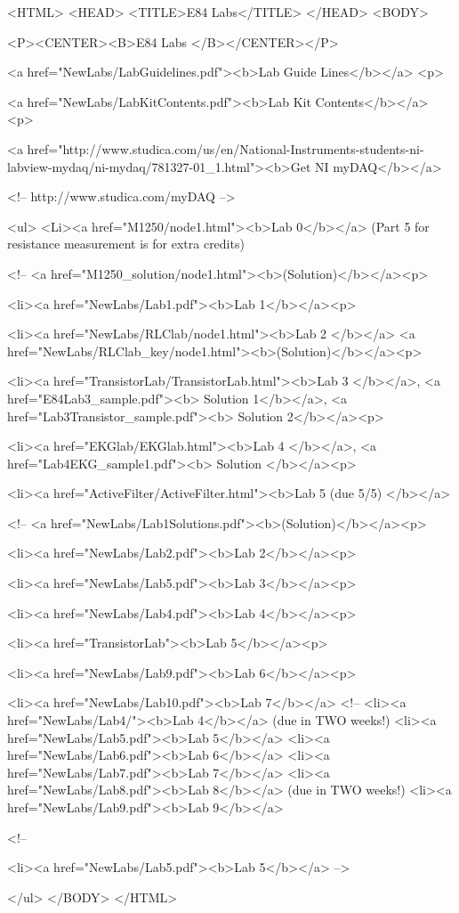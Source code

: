 


<HTML>
<HEAD>
   <TITLE>E84 Labs</TITLE>
</HEAD>
<BODY>

<P><CENTER><B>E84 Labs
</B></CENTER></P>

<a href="NewLabs/LabGuidelines.pdf"><b>Lab Guide Lines</b></a>
<p>

<a href="NewLabs/LabKitContents.pdf"><b>Lab Kit Contents</b></a>
<p>

<a href="http://www.studica.com/us/en/National-Instruments-students-ni-labview-mydaq/ni-mydaq/781327-01_1.html"><b>Get NI myDAQ</b></a>

<!--
http://www.studica.com/myDAQ
-->

<ul>
<Li><a href="M1250/node1.html"><b>Lab 0</b></a>
(Part 5 for resistance measurement is for extra credits)

<!--
  <a href="M1250_solution/node1.html"><b>(Solution)</b></a><p>

<li><a href="NewLabs/Lab1.pdf"><b>Lab 1</b></a><p>

<li><a href="NewLabs/RLClab/node1.html"><b>Lab 2 </b></a>
  <a href="NewLabs/RLClab_key/node1.html"><b>(Solution)</b></a><p>

<li><a href="TransistorLab/TransistorLab.html"><b>Lab 3 </b></a>,
    <a href="E84Lab3_sample.pdf"><b> Solution 1</b></a>,
    <a href="Lab3Transistor_sample.pdf"><b> Solution 2</b></a><p>

<li><a href="EKGlab/EKGlab.html"><b>Lab 4 </b></a>, 
    <a href="Lab4EKG_sample1.pdf"><b> Solution </b></a><p>

<li><a href="ActiveFilter/ActiveFilter.html"><b>Lab 5 (due 5/5) </b></a>


<!--
  <a href="NewLabs/Lab1Solutions.pdf"><b>(Solution)</b></a><p>

<li><a href="NewLabs/Lab2.pdf"><b>Lab 2</b></a><p>

<li><a href="NewLabs/Lab5.pdf"><b>Lab 3</b></a><p>  

<li><a href="NewLabs/Lab4.pdf"><b>Lab 4</b></a><p>

<li><a href="TransistorLab"><b>Lab 5</b></a><p>

<li><a href="NewLabs/Lab9.pdf"><b>Lab 6</b></a><p>  

<li><a href="NewLabs/Lab10.pdf"><b>Lab 7</b></a>  
<!--
<li><a href="NewLabs/Lab4/"><b>Lab 4</b></a>     (due in TWO weeks!)
<li><a href="NewLabs/Lab5.pdf"><b>Lab 5</b></a>     
<li><a href="NewLabs/Lab6.pdf"><b>Lab 6</b></a>     
<li><a href="NewLabs/Lab7.pdf"><b>Lab 7</b></a>     
<li><a href="NewLabs/Lab8.pdf"><b>Lab 8</b></a>  (due in TWO weeks!)   
<li><a href="NewLabs/Lab9.pdf"><b>Lab 9</b></a>  


<!--

<li><a href="NewLabs/Lab5.pdf"><b>Lab 5</b></a>
-->

</ul>
</BODY>
</HTML>



